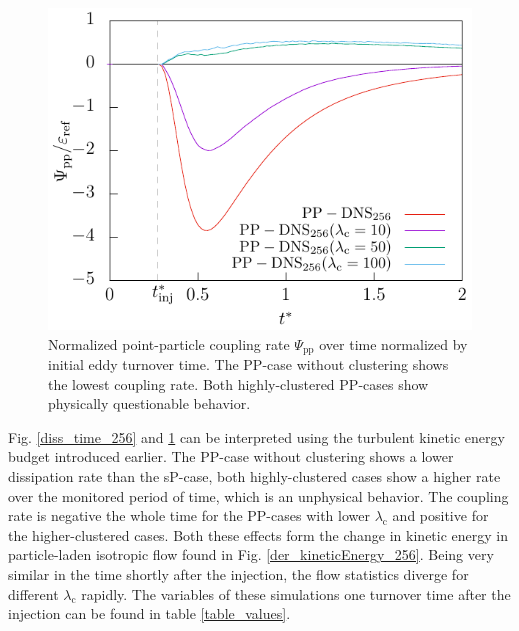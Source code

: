 \documentclass[11pt,a4paper,openany,oneside,parskip=half*]{article}
\begin{document}
\begin{figure}[h]
\begin{minipage}[t]{0.5\textwidth}
        \includegraphics[width=\linewidth]{./Abbildungen/256/coupling_time.pdf}
        \caption{Normalized point-particle coupling rate $\Psi_\mathrm{pp}$ over time normalized by initial eddy turnover time. The PP-case without clustering shows the lowest coupling rate. Both highly-clustered PP-cases show physically questionable behavior.}
        \label{coupling_time_256}
    \end{minipage}
\end{figure}
\newline
Fig. \ref{diss_time_256} and \ref{coupling_time_256} can be interpreted using the turbulent kinetic energy budget introduced earlier. The PP-case without clustering shows a lower dissipation rate than the sP-case, both highly-clustered cases show a higher rate over the monitored period of time, which is an unphysical behavior. The coupling rate is negative the whole time for the PP-cases with lower $\lambda_\mathrm{c}$ and positive for the higher-clustered cases. Both these effects form the change in kinetic energy in particle-laden isotropic flow found in Fig. \ref{der_kineticEnergy_256}.
\newline
Being very similar in the time shortly after the injection, the flow statistics diverge for different $\lambda_\mathrm{c}$ rapidly. The variables of these simulations one turnover time after the injection can be found in table \ref{table_values}. 
\end{document}
